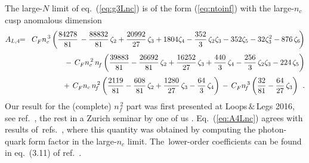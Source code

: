 \documentclass[12pt]{article}
\newcommand{\bea}{\begin{eqnarray}}
\newcommand{\eea}{\end{eqnarray}}
\newcommand{\hspn}{{\hspace{-5mm}}}
\def\nc{{n_c}}
\def\ncs{{n_{c}^{\,2}}}
\def\nct{{n_{c}^{\,3}}}
\def\cf{{C^{}_F}}
\def\nf{{n^{}_{\! f}}}
\def\nfs{{n^{\,2}_{\! f}}}
\def\nft{{n^{\,3}_{\! f}}}
\begin{document}
\noindent
The large-$N$ limit of eq.~(\ref{eq:g3Lnc}) is of the form (\ref{eq:ntoinf})
with the large-$\nc$ cusp anomalous dimension 
\bea
%
\label{eq:A4Lnc}
  A_{L,4} &\!\!=\!& 
         \cf \* \nct \* \left(
            \frac{84278}{81}\,
          - \frac{88832}{81}\,\*\zeta_2
          + \frac{20992}{27}\,\*\zeta_3
          + 1804\*\zeta_4
          - \frac{352}{3}\,\*\zeta_2\*\zeta_3
          - 352\*\zeta_5
          - 32\*\zeta_3^2
          - 876\,\*\zeta_6 
\!
          \right)
\nonumber \\[1mm] && \mbox{\hspn}
       - \,\cf\*\ncs\,\*\nf \* \left(
            \frac{39883}{81}
          - \frac{26692}{81}\,\*\zeta_2
          + \frac{16252}{27}\,\*\zeta_3
          + \frac{440}{3}\,\*\zeta_4
          - \frac{256}{3}\,\*\zeta_2\*\zeta_3
          - 224\,\*\zeta_5
          \right)
\nonumber \\[1mm] && \mbox{\hspn}
        + \,\cf\*\nc\,\*\nfs \* \left(
            \frac{2119}{81}
          - \frac{608}{81}\,\*\zeta_2
          + \frac{1280}{27}\,\*\zeta_3
          - \frac{64}{3}\,\*\zeta_4
          \right)
        \,-\, \cf\*\nft \* \left(
            \frac{32}{81}
          - \frac{64}{27}\,\*\zeta_3
          \right)
\:\: . 
\eea
%
%
Our result for the (complete) $\nfs$ part was first presented at 
Loops$\,\&\,$Legs 2016, see ref.~\cite{Ruijl:2016pkm}, the rest in a Zurich 
seminar by one of us \cite{BRuijl6dec16}. Eq.~(\ref{eq:A4Lnc}) agrees with 
results of~refs.~\cite{Henn:2016men,Lee:2016ixa}, where this quantity was
obtained by computing the photon-quark form factor in the large-$\nc$ limit. 
The~lower-order coefficients can be found in eq.~(3.11) of 
ref.~\cite{Moch:2004pa}.
\end{document}
